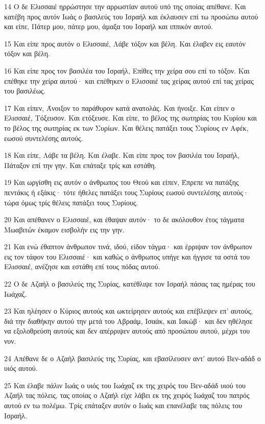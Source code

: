 \par 14 Ο δε Ελισσαιέ ηρρώστησε την αρρωστίαν αυτού υπό της οποίας απέθανε. Και κατέβη προς αυτόν Ιωάς ο βασιλεύς του Ισραήλ και έκλαυσεν επί τω προσώπω αυτού και είπε, Πάτερ μου, πάτερ μου, άμαξα του Ισραήλ και ιππικόν αυτού.
\par 15 Και είπε προς αυτόν ο Ελισσαιέ, Λάβε τόξον και βέλη. Και έλαβεν εις εαυτόν τόξον και βέλη.
\par 16 Και είπε προς τον βασιλέα του Ισραήλ, Επίθες την χείρα σου επί το τόξον. Και επέθηκε την χείρα αυτού· και επέθηκεν ο Ελισσαιέ τας χείρας αυτού επί τας χείρας του βασιλέως.
\par 17 Και είπεν, Άνοιξον το παράθυρον κατά ανατολάς. Και ήνοιξε. Και είπεν ο Ελισσαιέ, Τόξευσον. Και ετόξευσε. Και είπε, το βέλος της σωτηρίας του Κυρίου και το βέλος της σωτηρίας εκ των Συρίων. Και θέλεις πατάξει τους Συρίους εν Αφέκ, εωσού συντελέσης αυτούς.
\par 18 Και είπε, Λάβε τα βέλη. Και έλαβε. Και είπε προς τον βασιλέα του Ισραήλ, Πάταξον επί την γην. Και επάταξε τρίς και εστάθη.
\par 19 Και ωργίσθη εις αυτόν ο άνθρωπος του Θεού και είπεν, Έπρεπε να πατάξης πεντάκις ή εξάκις· τότε ήθελες πατάξει τους Συρίους εωσού συντελέσης αυτούς· τώρα όμως τρίς θέλεις πατάξει τους Συρίους.
\par 20 Και απέθανεν ο Ελισσαιέ, και έθαψαν αυτόν· το δε ακόλουθον έτος τάγματα Μωαβιτών έκαμον εισβολήν εις την γην.
\par 21 Και ενώ έθαπτον άνθρωπον τινά, ιδού, είδον τάγμα· και έρριψαν τον άνθρωπον εις τον τάφον του Ελισσαιέ· και καθώς ο άνθρωπος υπήγε και ήγγισε τα οστά του Ελισσαιέ, ανέζησε και εστάθη επί τους πόδας αυτού.
\par 22 Ο δε Αζαήλ ο βασιλεύς της Συρίας, κατέθλιψε τον Ισραήλ πάσας τας ημέρας του Ιωάχαζ.
\par 23 Και ηλέησεν ο Κύριος αυτούς και ωκτείρησεν αυτούς και επέβλεψεν επ' αυτούς, διά την διαθήκην αυτού την μετά του Αβραάμ, Ισαάκ, και Ιακώβ· και δεν ηθέλησε να εξολοθρεύση αυτούς και δεν απέρριψεν αυτούς από προσώπου αυτού, μέχρι του νυν.
\par 24 Απέθανε δε ο Αζαήλ βασιλεύς της Συρίας, και εβασίλευσεν αντ' αυτού Βεν-αδάδ ο υιός αυτού.
\par 25 Και έλαβε πάλιν Ιωάς ο υιός του Ιωάχαζ εκ της χειρός του Βεν-αδάδ υιού του Αζαήλ τας πόλεις, τας οποίας ο Αζαήλ είχε λάβει εκ της χειρός Ιωάχαζ του πατρός αυτού εν τω πολέμω. Τρίς επάταξεν αυτόν ο Ιωάς και επανέλαβε τας πόλεις του Ισραήλ.

